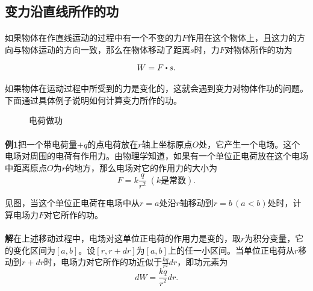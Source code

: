 \subsection{变力沿直线所作的功}
\paragraph{}
如果物体在作直线运动的过程中有一个不变的力$F$作用在这个物体上，且这力的方向与物体运动的方向一致，那么在物体移动了距离$s$时，力$F$对物体所作的功为

\begin{equation}
  W = F \bigcdot s.
\end{equation}

\paragraph{}
如果物体在运动过程中所受到的力是变化的，这就会遇到变力对物体作功的问题。下面通过具体例子说明如何计算变力所作的功。

\begin{figure}[H]
\centering
  
  \caption{电荷做功}
  \label{电荷做功}
\end{figure}

\paragraph{}
\textbf{例1\;}把一个带电荷量$+q$的点电荷放在$r$轴上坐标原点$O$处，它产生一个电场。这个电场对周围的电荷有作用力。由物理学知道，如果有一个单位正电荷放在这个电场中距离原点$O$为$r$的地方，那么电场对它的作用力的大小为
\begin{equation}
  F = k\frac{q}{r^2} \; (k\text{是常数}).
\end{equation}

见图，当这个单位正电荷在电场中从$r=a$处沿$r$轴移动到$r=b \, (a<b)$处时，计算电场力$F$对它所作的功。

\paragraph{}
\textbf{解\;}在上述移动过程中，电场对这单位正电荷的作用力是变的，取$r$为积分变量，它的变化区间为$[a,b]$。设$[r,r+dr]$为$[a,b]$上的任一小区间。当单位正电荷从$r$移动到$r+dr$时，电场力对它所作的功近似于$\displaystyle\frac{kq}{r^2}dr$，即功元素为
\begin{equation}
  dW = \frac{kq}{r^2}dr.
\end{equation}

